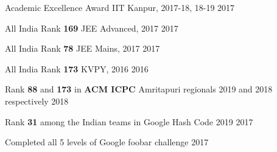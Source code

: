 \begin{cvhonorsa}
{\Large
  

  \cvhonora
  {Academic Excellence Award}
  {IIT Kanpur, 2017-18, 18-19}
  {}
  {2017}
  
  \cvhonora
  {All India Rank \textbf{169}}
  {JEE Advanced, 2017}
  {}
  {2017}

  \cvhonora
  {All India Rank \textbf{78}}
  {JEE Mains, 2017}
  {}
  {2017}

  \cvhonora
  {All India Rank \textbf{173}}
  {KVPY, 2016}
  {}
  {2016}
  \iffalse
  \cvhonora
  {National Top 1\% in NSEC}
  {Chemistry Olympiad}
  {}
  {2017}
  \fi
}

\end{cvhonorsa}
\begin{cvhonors}
{
  \cvhonor
  {Rank \textbf{88} and \textbf{173} in \textbf{ACM ICPC} Amritapuri regionals 2019 and 2018 respectively}
  {}
  {2018}
  
  \cvhonor
  {Rank \textbf{31} among the Indian teams in Google Hash Code 2019}
  {}
  {2017}

  \cvhonor
  {Completed all 5 levels of Google foobar challenge}
  {}
  {2017}

}
\end{cvhonors}
